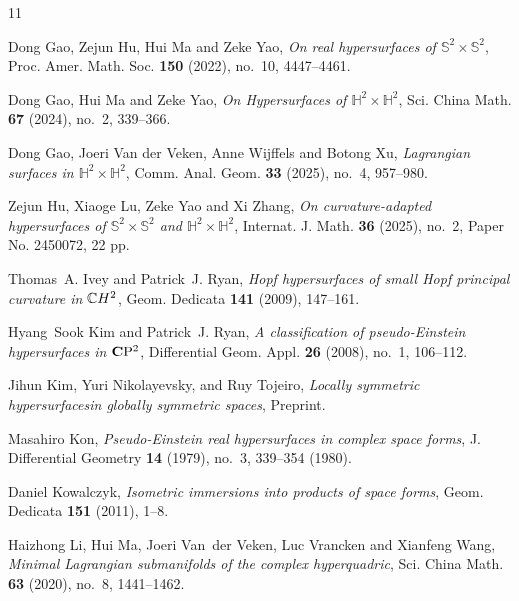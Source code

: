 \documentclass[reqno]{amsart}%
\theoremstyle{definition}
\numberwithin{equation}{section}
\begin{document}
\begin{thebibliography}{11}

Dong Gao, Zejun Hu, Hui Ma and Zeke Yao, \emph{On real hypersurfaces of
{$\mathbb{S}^2\times\mathbb{S}^2$}}, Proc. Amer. Math. Soc. \textbf{150} (2022),
no.~10, 4447--4461. 

Dong Gao, Hui Ma and Zeke Yao, \emph{On Hypersurfaces of $\mathbb{H}^2\times \mathbb{H}^2$},
Sci. China Math. \textbf{67} (2024), no.~2, 339--366.

Dong Gao, Joeri Van der Veken, Anne Wijffels and Botong Xu,
\emph{Lagrangian surfaces in $\mathbb{H}^2\times \mathbb{H}^2$},
Comm. Anal. Geom. \textbf{33} (2025), no.~4, 957--980.

Zejun Hu, Xiaoge Lu, Zeke Yao and Xi Zhang, \emph{On curvature-adapted hypersurfaces of $\mathbb{S}^2\times \mathbb{S}^2$ and $\mathbb{H}^2\times \mathbb{H}^2$},
Internat. J. Math. \textbf{36} (2025), no.~2, Paper No. 2450072, 22 pp.

Thomas~A. Ivey and Patrick~J. Ryan, \emph{Hopf hypersurfaces of small {H}opf
principal curvature in {$\Bbb CH^2$}}, Geom. Dedicata \textbf{141} (2009),
147--161. 

Hyang~Sook Kim and Patrick~J. Ryan, \emph{A classification of pseudo-{E}instein
hypersurfaces in {$\bold C{\rm P}^2$}}, Differential Geom. Appl. \textbf{26}
(2008), no.~1, 106--112. 

Jihun Kim, Yuri Nikolayevsky, and Ruy Tojeiro, \emph{Locally symmetric hypersurfacesin globally symmetric spaces}, Preprint.


Masahiro Kon, \emph{Pseudo-{E}instein real hypersurfaces in complex space
forms}, J. Differential Geometry \textbf{14} (1979), no.~3, 339--354 (1980).

Daniel Kowalczyk, \emph{Isometric immersions into products of space forms},
Geom. Dedicata \textbf{151} (2011), 1--8. 


Haizhong Li, Hui Ma, Joeri Van~der Veken, Luc Vrancken and Xianfeng Wang,
\emph{Minimal {L}agrangian submanifolds of the complex hyperquadric}, Sci.
China Math. \textbf{63} (2020), no.~8, 1441--1462. 


\end{thebibliography}
\end{document}

